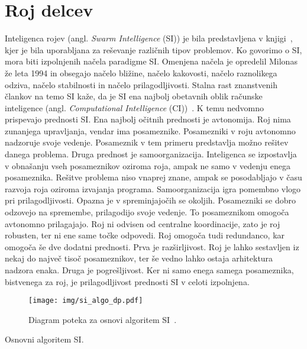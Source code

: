 \section{Roj delcev}

Inteligenca rojev (angl. \textit{Swarm Intelligence} (SI)) je bila predstavljena v knjigi~\cite{bib:swarm_intelligence}, kjer je bila uporabljana za reševanje različnih tipov problemov.
Ko govorimo o SI, mora biti izpolnjenih načela paradigme SI.
Omenjena načela je opredelil Milonas~\cite{bib:si_principles} že leta 1994 in obsegajo načelo bližine, načelo kakovosti, načelo raznolikega odziva, načelo stabilnosti in načelo prilagodljivosti.
Stalna rast znanstvenih člankov na temo SI kaže, da je SI ena najbolj obetavnih oblik računske inteligence (angl. \textit{Computational Intelligence} (CI))~\cite{bib:computational_intelligence}.
K temu nedvomno prispevajo prednosti SI.
Ena najbolj očitnih prednosti je avtonomija.
Roj nima zunanjega upravljanja, vendar ima posameznike.
Posamezniki v roju avtonomno nadzoruje svoje vedenje.
Posameznik v tem primeru predstavlja možno rešitev danega problema.
Druga prednost je samoorganizacija.
Inteligenca se izpostavlja v obnašanju vseh posameznikov oziroma roja, ampak ne samo v vedenju enega posameznika.
Rešitve problema niso vnaprej znane, ampak se posodabljajo v času razvoja roja oziroma izvajanja programa.
Samoorganizacija igra pomembno vlogo pri prilagodljivosti.
Opazna je v spreminjajočih se okoljih.
Posamezniki se dobro odzovejo na spremembe, prilagodijo svoje vedenje.
To posameznikom omogoča avtonomno prilagajajo.
Roj ni odvisen od centralne koordinacije, zato je roj robusten, ter ni ene same točke odpovedi.
Roj omogoča tudi redundanco, kar omogoča še dve dodatni prednosti.
Prva je razširljivost.
Roj je lahko sestavljen iz nekaj do največ tisoč posameznikov, ter še vedno lahko ostaja arhitektura nadzora enaka.
Druga je pogrešljivost.
Ker ni samo enega samega posameznika, bistvenega za roj, je prilagodljivost prednosti SI v celoti izpolnjena.

\begin{figure}[ht]
    \centering
    \texttt{[image: img/si\_algo\_dp.pdf]}
    \caption{Diagram poteka za osnovi algoritem SI~\cite{bib:swarm_intelligence}.}\label{fig:si_algo_dp}
\end{figure}

\begin{algorithm}
    \DontPrintSemicolon


    \caption{Osnovni algoritem SI.}\label{pcode:si_base}
\end{algorithm}

